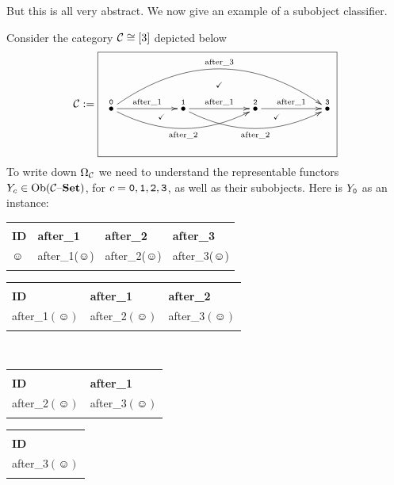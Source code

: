 \documentclass[CT4S-EN-RU]{subfiles}
\begin{document}
But this is all very abstract. We now give an example of a subobject classifier.  

\begin{example}

Consider the category $\mathcal{C}\cong[3]$ depicted below
$$\mcC:=\parbox{3in}{\fbox{
\xymatrix{&&&\ar@{}[d]|(.4){\checkmark}&&&\\
\LTO{0}\ar[rr]^{\tn{after\_1}}\ar@/_1.5pc/[rrrr]_{\tn{after\_2}}\ar@/^3pc/[rrrrrr]^{\tn{after\_3}}&&\LTO{1}\ar[rr]^{\tn{after\_1}}\ar@/_1.5pc/[rrrr]_{\tn{after\_2}}&&\LTO{2}\ar[rr]^{\tn{after\_1}}&&\LTO{3}\\
&&&\ar@{}[ull]|(.8){\checkmark}\ar@{}[urr]|(.8){\checkmark}&&
}}}
$$
To write down $\Omega_\mathcal{C}$ we need to understand the representable functors $Y_c\in\textnormal{Ob}(\mathcal{C}{\text \textendash}{\bf Set})$, for $c={\tt 0},{\tt 1},{\tt 2},{\tt 3}$, as well as their subobjects. Here is $Y_{\tt 0}$ as an instance:

\begin{center}\small
\begin{tabular}{| l || l | l | l |}
\bhline
\multicolumn{4}{|c|}{$Y_{\tt 0}({\tt 0})$}\\\bhline
{\bf ID}&{\bf after\_1}&{\bf after\_2}&{\bf after\_3}\\\bbhline
$\smiley$&after\_1($\smiley$)&after\_2($\smiley$)&after\_3($\smiley$)\\\bhline
\end{tabular}
\hsp
\begin{tabular}{| l || l | l |}
\bhline
\multicolumn{3}{|c|}{$Y_{\tt 0}({\tt 1})$}\\\bhline
{\bf ID}&{\bf after\_1}&{\bf after\_2}\\\bbhline
after\_1$(\smiley)$&after\_2$(\smiley)$&after\_3$(\smiley)$\\\bhline
\end{tabular}\\\vspace{.2in}
\begin{tabular}{| l || l |}
\bhline
\multicolumn{2}{|c|}{$Y_{\tt 0}({\tt 2})$}\\\bhline
{\bf ID}&{\bf after\_1}\\\bbhline
after\_2$(\smiley)$&after\_3$(\smiley)$\\\bhline
\end{tabular}
\hsp
\begin{tabular}{| l ||}
\bhline
\multicolumn{1}{|c|}{$Y_{\tt 0}({\tt 3})$}\\\bhline
{\bf ID}\\\bbhline
after\_3$(\smiley)$\\\bhline
\end{tabular}


\end{center}
\end{example}
\end{document}
